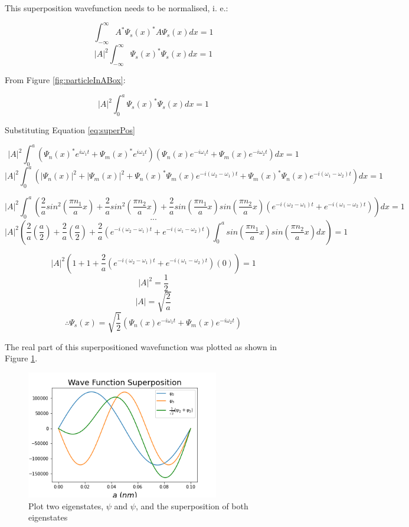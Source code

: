 This superposition wavefunction needs to be normalised, i. e.:

$$\int_{ -\infty}^{\infty} A^{*} \Psi_s (x)^{*} A\Psi_s (x)dx = 1$$
$$\left | A \right |^2 \int_{ -\infty}^{\infty} \Psi_s (x)^{*} \Psi_s (x)dx = 1$$

From Figure \ref{fig:particleInABox}:

$$\left | A \right |^2 \int_{0}^{a} \Psi_s (x)^{*} \Psi_s (x)dx = 1$$

Substituting Equation \ref{eq:superPos}

$$\left | A \right |^2 \int_{0}^{a} (\Psi_n (x)^{*}e^{i \omega_{1} t} + \Psi_m (x)^{*}e^{i \omega_{2} t}) (\Psi_n (x)e^{-i \omega_{1} t} + \Psi_m (x)e^{-i \omega_{2} t})dx = 1$$
$$\left | A \right |^2 \int_{0}^{a} (\left | \Psi_n (x) \right |^2 + \left | \Psi_m (x) \right |^2 + \Psi_n (x)^{*}\Psi_m (x)e^{-i(\omega_{2}- \omega_{1}) t} + \Psi_m (x)^{*}\Psi_n (x)e^{-i(\omega_{1}- \omega_{2}) t})dx = 1$$

$$ \left | A \right |^2 \int_{0}^{a}\left(\frac{2}{a} sin^{2}(\frac{\pi n_1}{a}x)+\frac{2}{a} sin^{2}(\frac{\pi n_2}{a}x)+\frac{2}{a} sin(\frac{\pi n_1}{a}x)sin(\frac{\pi n_2}{a}x)(e^{-i(\omega_{2}- \omega_{1})t}+e^{-i(\omega_{1}- \omega_{2})t})\right)dx = 1$$
$$...$$
$$\left | A \right |^2 \left( \frac{2}{a}\left(\frac{a}{2}\right) + \frac{2}{a}\left(\frac{a}{2}\right) + \frac{2}{a}(e^{-i(\omega_{2}- \omega_{1})t}+e^{-i(\omega_{1}- \omega_{2})t})\int_{0}^{a} sin(\frac{\pi n_1}{a}x)sin(\frac{\pi n_2}{a}x)dx \right)=1$$

$$\left | A \right |^2 \left( 1 + 1 + \frac{2}{a}(e^{-i(\omega_{2}- \omega_{1})t}+e^{-i(\omega_{1}- \omega_{2})t})(0) \right)=1$$
$$\left | A \right |^2 = \frac{1}{2}$$
$$\left | A \right | = \sqrt{\frac{2}{a}}$$
$$\therefore \Psi_s (x) = \sqrt{\frac{1}{2}} \left( \Psi_n (x)e^{-i \omega_{1} t} + \Psi_m (x)e^{-i \omega_{2} t}\right)$$

The real part of this superpositioned wavefunction was plotted as shown in Figure \ref{fig:superPosWave}.

\begin{figure}[h]
    \centering
    \includegraphics[width=0.75\textwidth]{lab1/images/superpositionWave.png}
    \caption{Plot two eigenstates, $\psi$ and $\psi$, and the superposition of both eigenstates}
    \label{fig:superPosWave}
\end{figure}


